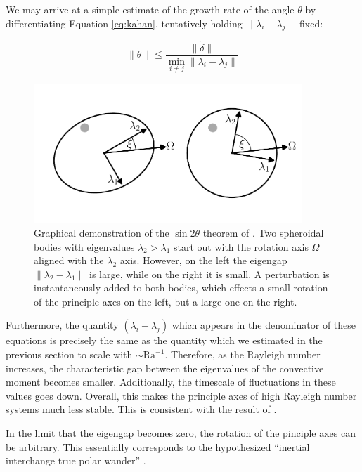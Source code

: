 \documentclass[extra,mreferee]{gji}
\begin{document}
We may arrive at a simple estimate of the growth rate of the angle $\theta$ by differentiating Equation \ref{eq:kahan}, tentatively holding $\lVert \lambda_i - \lambda_j \rVert$ fixed:

\begin{equation}
\lVert \dot{\theta} \rVert \le \frac{ \lVert \dot{\delta} \rVert}{ \displaystyle \min_{i \neq j} \lVert \lambda_i - \lambda_j \rVert }
\label{eq:grow_perturbation}
\end{equation} 

\begin{figure}
\centering
\label{fig:perturb}
\includegraphics[width=0.9\textwidth]{figures/perturb.pdf}
\caption{Graphical demonstration of the $\sin{2 \theta}$ theorem of \citet{davis1970rotation}.  Two spheroidal bodies with eigenvalues $\lambda_2 > \lambda_1$ start out with the rotation axis $\Omega$ aligned with the $\lambda_2$ axis. However, on the left the eigengap $\lVert \lambda_2 - \lambda_1 \rVert$ is large, while on the right it is small.  A perturbation is instantaneously added to both bodies, which effects a small rotation of the principle axes on the left, but a large one on the right.}
\end{figure}


Furthermore, the quantity $(\lambda_i-\lambda_j)$ which appears in the denominator of these equations is precisely the same as the quantity which we estimated in the previous section to scale with $\sim \mathrm{Ra}^{-1}$.
Therefore, as the Rayleigh number increases, the characteristic gap between the eigenvalues of the convective moment becomes smaller.  
Additionally, the timescale of fluctuations in these values goes down. 
Overall, this makes the principle axes of high Rayleigh number systems much less stable.
This is consistent with the result of \citet{richards1999polar}.

In the limit that the eigengap becomes zero, the rotation of the pinciple axes can be arbitrary. 
This essentially corresponds to the hypothesized ``inertial interchange true polar wander'' \citep{kirschvink1997evidence}.
\end{document}
